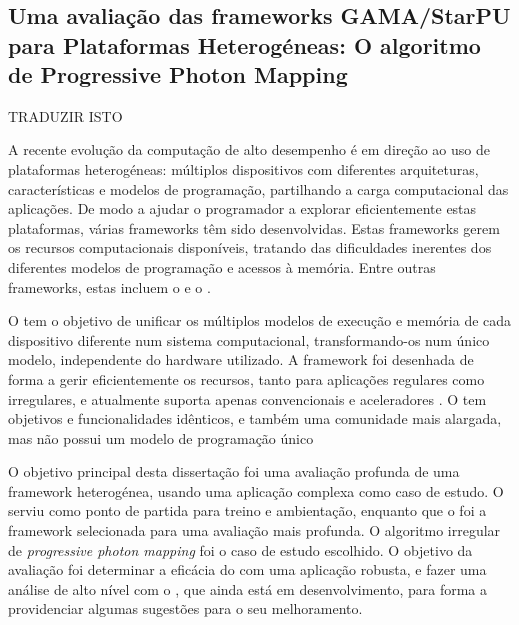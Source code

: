 \documentclass[main.tex]{subfiles}
\begin{document}
\cleardoublepage
{}
{}
\chapter*{\abstractname}
  \section*{Uma avaliação das frameworks GAMA/StarPU para Plataformas Heterogéneas: O algoritmo de Progressive Photon Mapping}

  TRADUZIR ISTO

  A recente evolução da computação de alto desempenho é em direção ao uso de plataformas heterogéneas: múltiplos dispositivos com diferentes arquiteturas, características e modelos de programação, partilhando a carga computacional das aplicações. De modo a ajudar o programador a explorar eficientemente estas plataformas, várias frameworks têm sido desenvolvidas. Estas frameworks gerem os recursos computacionais disponíveis, tratando das dificuldades inerentes dos diferentes modelos de programação e acessos à memória. Entre outras frameworks, estas incluem o \gama e o \starpu.

  O \gama tem o objetivo de unificar os múltiplos modelos de execução e memória de cada dispositivo diferente num sistema computacional, transformando-os num único modelo, independente do hardware utilizado. A framework foi desenhada de forma a gerir eficientemente os recursos, tanto para aplicações regulares como irregulares, e atualmente suporta apenas \cpus convencionais e aceleradores \cuda. O \starpu tem objetivos e funcionalidades idênticos, e também uma comunidade mais alargada, mas não possui um modelo de programação único

  O objetivo principal desta dissertação foi uma avaliação profunda de uma framework heterogénea, usando uma aplicação complexa como caso de estudo. O \gama serviu como ponto de partida para treino e ambientação, enquanto que o \starpu foi a framework selecionada para uma avaliação mais profunda. O algoritmo irregular de \textit{progressive photon mapping} foi o caso de estudo escolhido. O objetivo da avaliação foi determinar a eficácia do \starpu com uma aplicação robusta, e fazer uma análise de alto nível com o \gama, que ainda está em desenvolvimento, para forma a providenciar algumas sugestões para o seu melhoramento.

\end{document}
